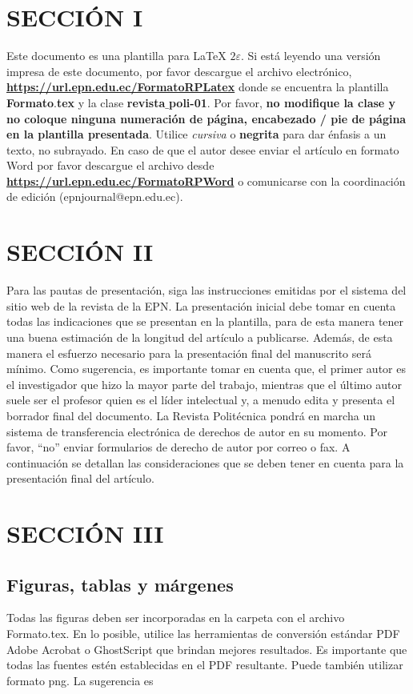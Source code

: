 \documentclass[10.5 pt, twocolumn]{article}
\begin{document}
\section{SECCIÓN I}

Este documento es una plantilla para \LaTeX{} $2\varepsilon$. Si está leyendo una versión impresa de este documento, por favor descargue el archivo  electrónico, \textbf{\url{https://url.epn.edu.ec/FormatoRPLatex}} donde se encuentra la plantilla \textbf{Formato$.$tex} y la clase \textbf{revista$\_$poli-01}. Por favor, {\bf no modifique la clase y no coloque ninguna numeración de página, encabezado / pie de página en la plantilla presentada}. Utilice \textit{cursiva} o \textbf{negrita} para dar énfasis a un texto, no subrayado. En caso de que el autor desee enviar el artículo en formato Word por favor descargue el archivo desde \textbf{\url{https://url.epn.edu.ec/FormatoRPWord}} o comunicarse con la coordinación de edición (epnjournal@epn.edu.ec).

\section{SECCIÓN II}

Para las pautas de presentación, siga las instrucciones emitidas por el sistema del sitio web de la revista de la EPN. La presentación inicial debe tomar en cuenta todas las indicaciones que se presentan en la plantilla, para de esta manera tener una buena estimación de la longitud del artículo a publicarse. Además, de esta manera el esfuerzo necesario para la presentación final del manuscrito será mínimo. Como sugerencia, es importante tomar en cuenta que, el primer autor es el investigador que hizo la mayor parte del trabajo, mientras que el último autor suele ser el profesor quien es el líder intelectual y, a menudo edita y presenta el borrador final del documento. La Revista Politécnica pondrá en marcha un sistema de transferencia electrónica de derechos de autor en su momento. Por favor, ``no'' enviar formularios de derecho de autor por correo o fax. A continuación se detallan las consideraciones que se deben tener en cuenta para la presentación final del artículo.

\section{SECCIÓN III}


\subsection{Figuras, tablas y márgenes}
Todas las figuras deben ser incorporadas en la carpeta con el archivo Formato.tex. En lo posible, utilice las herramientas de conversión estándar PDF Adobe Acrobat o GhostScript que brindan mejores resultados. Es importante que todas las fuentes estén establecidas en el PDF resultante. Puede también utilizar formato png. La sugerencia es
\end{document}
